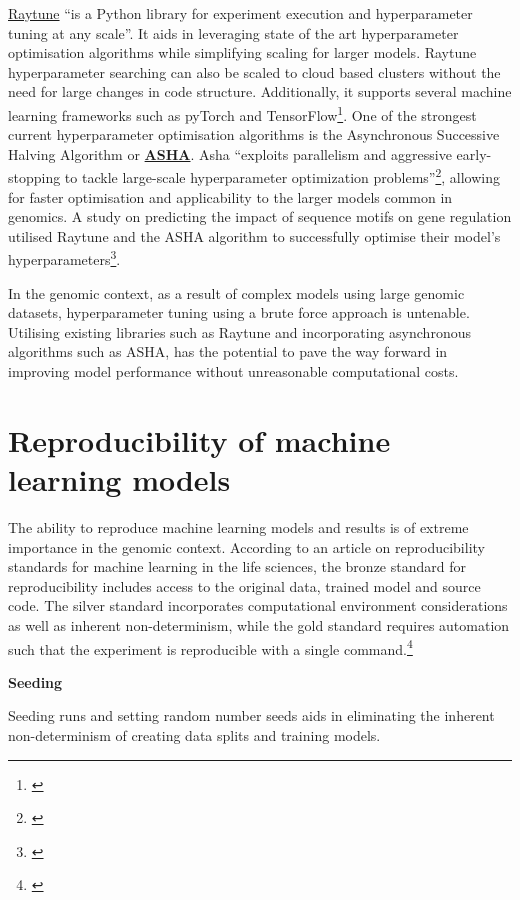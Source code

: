 \documentclass[
]{book}
\begin{document}
\href{https://docs.ray.io/en/latest/tune/index.html}{Raytune} ``is a Python library for experiment execution and hyperparameter tuning at any scale''. It aids in leveraging state of the art hyperparameter optimisation algorithms while simplifying scaling for larger models. Raytune hyperparameter searching can also be scaled to cloud based clusters without the need for large changes in code structure. Additionally, it supports several machine learning frameworks such as pyTorch and TensorFlow\footnote{\citet{liaw2018}}. One of the strongest current hyperparameter optimisation algorithms is the Asynchronous Successive Halving Algorithm or \textbf{\href{https://blog.ml.cmu.edu/2018/12/12/massively-parallel-hyperparameter-optimization/}{ASHA}}. Asha ``exploits parallelism and aggressive early-stopping to tackle large-scale hyperparameter optimization problems''\footnote{\citet{liam2018}}, allowing for faster optimisation and applicability to the larger models common in genomics. A study on predicting the impact of sequence motifs on gene regulation utilised Raytune and the ASHA algorithm to successfully optimise their model's hyperparameters\footnote{\citet{jacob2023}}.

In the genomic context, as a result of complex models using large genomic datasets, hyperparameter tuning using a brute force approach is untenable. Utilising existing libraries such as Raytune and incorporating asynchronous algorithms such as ASHA, has the potential to pave the way forward in improving model performance without unreasonable computational costs.

\chapter{Reproducibility of machine learning models}\label{reproducibility-of-machine-learning-models}

The ability to reproduce machine learning models and results is of extreme importance in the genomic context. According to an article on reproducibility standards for machine learning in the life sciences, the bronze standard for reproducibility includes access to the original data, trained model and source code. The silver standard incorporates computational environment considerations as well as inherent non-determinism, while the gold standard requires automation such that the experiment is reproducible with a single command.\footnote{\citet{ben2021}}

\textbf{Seeding}

Seeding runs and setting random number seeds aids in eliminating the inherent non-determinism of creating data splits and training models.
\end{document}
